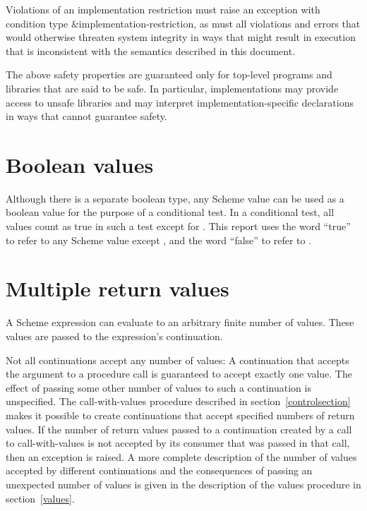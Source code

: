 Violations of an implementation restriction must raise an
exception with condition type {\cf\&implementation-restriction},
as must all
violations and errors that would otherwise threaten system
integrity in ways that might result in execution that is
inconsistent with the semantics described in this document.

The above safety properties are guaranteed only for top-level programs
and libraries that are said to be safe.  In particular, implementations
may provide access to unsafe libraries and may interpret
implementation-specific declarations in ways that
cannot guarantee safety.

\section{Boolean values}
\label{booleanvaluessection}

Although there is a separate boolean type, any Scheme value can be
used as a boolean value for the purpose of a conditional test.  In a
conditional test, all values count as true in such a test except for
\schfalse{}.  This report uses the word ``true'' to refer to any
Scheme value except \schfalse{}, and the word ``false'' to refer to
\schfalse{}.  

\section{Multiple return values}
\label{multiplereturnvaluessection}

A Scheme expression can evaluate to an arbitrary finite number of
values.  These values are passed to the expression's continuation.

Not all continuations accept any number of values: A continuation that
accepts the argument to a procedure call is guaranteed to accept
exactly one value.  The effect of passing some other number of values
to such a continuation is unspecified.  The {\cf call-with-values}
procedure
described in section~\ref{controlsection} makes it possible to create
continuations that accept specified numbers of return values.
If the number of
return values passed to a continuation created by a call to
{\cf call-with-values} is not accepted by its consumer
that was passed in that call, then an exception is raised.
A more complete description of the number of values accepted by
different continuations and the consequences of passing an unexpected
number of values is given in the description of the {\cf values}
procedure in section~\ref{values}.

